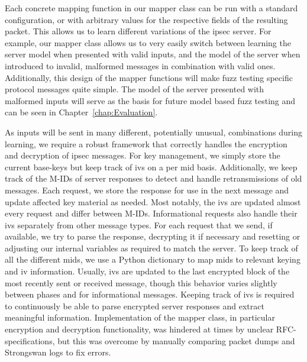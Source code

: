 Each concrete mapping function in our mapper class can be run with a standard configuration, or with arbitrary values for the respective fields of the resulting packet. This allows us to learn different variations of the \ac{ipsec} server. For example, our mapper class allows us to very easily switch between learning the server model when presented with valid inputs, and the model of the server when introduced to invalid, malformed messages in combination with valid ones. Additionally, this design of the mapper functions will make fuzz testing specific protocol messages quite simple. The model of the server presented with malformed inputs will serve as the basis for future model based fuzz testing and can be seen in Chapter~\ref{chap:Evaluation}.

As inputs will be sent in many different, potentially unusual, combinations during learning, we require a robust framework that correctly handles the encryption and decryption of \ac{ipsec} messages. For key management, we simply store the current base-keys but keep track of \acp{iv} on a per \ac{mid} basis. Additionally, we keep track of the M-IDs of server responses to detect and handle retransmissions of old messages. Each request, we store the response for use in the next message and update affected key material as needed. Most notably, the \acp{iv} are updated almost every request and differ between M-IDs. Informational requests also handle their \acp{iv} separately from other message types. For each request that we send, if available, we try to parse the response, decrypting it if necessary and resetting or adjusting our internal variables as required to match the server. To keep track of all the different \acp{mid}, we use a Python dictionary to map \acp{mid} to relevant keying and \ac{iv} information. Usually, \acp{iv} are updated to the last encrypted block of the most recently sent or received message, though this behavior varies slightly between phases and for informational messages. Keeping track of \acp{iv} is required to continuously be able to parse encrypted server responses and extract meaningful information. Implementation of the mapper class, in particular encryption and decryption functionality, was hindered at times by unclear RFC-specifications, but this was overcome by manually comparing packet dumps and Strongswan logs to fix errors.\\

